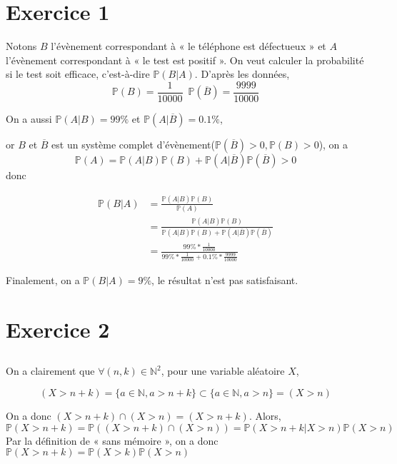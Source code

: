 \documentclass[a4paper,12pt]{book}
\begin{document}
\renewcommand{\labelitemi}{$\blacktriangleright$}
\renewcommand{\labelitemii}{$\bullet$}



\section{Exercice 1}
Notons $B$ l’évènement correspondant à « le téléphone est défectueux » et 
$A$ l’évènement correspondant à « le test est positif ». On veut calculer 
la probabilité si le test soit efficace, c’est-à-dire $\mathbb{P}(B|A)$. D’après
les données,
$$\mathbb{P}(B) = \frac{1}{10000}\,\,\,\mathbb{P}(\overline{B}) = \frac{9999}{10000}$$

On a aussi $\mathbb{P}(A|B)=99\%$ et $\mathbb{P}(A|\overline{B})=0.1\%$, 

or $B$ et $\overline{B}$ est un système complet d'évènement($\mathbb{P}(\overline{B})>0, \mathbb{P}(B)>0$), 
on a 
$$\mathbb{P}(A)=\mathbb{P}(A|B)\mathbb{P}(B)+\mathbb{P}(A|\overline{B})\mathbb{P}(\overline{B})>0$$
donc 



\begin{align*}    
    \mathbb{P}(B|A)&=\frac{\mathbb{P}(A|B)\mathbb{P}(B)}{\mathbb{P}(A)}\\
                   &=\frac{\mathbb{P}(A|B)\mathbb{P}(B)}{\mathbb{P}(A|B)\mathbb{P}(B)+\mathbb{P}(A|\overline{B})\mathbb{P}(\overline{B})}\\
                   &=\frac{99\%*\frac{1}{10000}}{99\%*\frac{1}{10000}+0.1\%*\frac{9999}{10000}}
\end{align*}

Finalement, on a $\boxed{\mathbb{P}(B|A)=9\%}$, le résultat n'est pas satisfaisant.
\section{Exercice 2}
\subsection{}
On a clairement que $\forall (n,k) \in \mathbb{N}^2$, pour une variable aléatoire $X$, 

$$(X>n+k)=\{a \in \mathbb{N}, a>n+k\} \subset \{a \in \mathbb{N}, a>n\}=(X>n)$$

On a donc $(X>n+k) \cap (X>n)=(X>n+k)$. Alors, 
$$
\mathbb{P}(X>n+k)=\mathbb{P}((X>n+k) \cap (X>n))=\mathbb{P}(X>n+k|X>n)\mathbb{P}(X>n)
$$
Par la définition de « sans mémoire », on a donc $\boxed{\mathbb{P}(X>n+k)=\mathbb{P}(X>k)\mathbb{P}(X>n)}$
\end{document}
